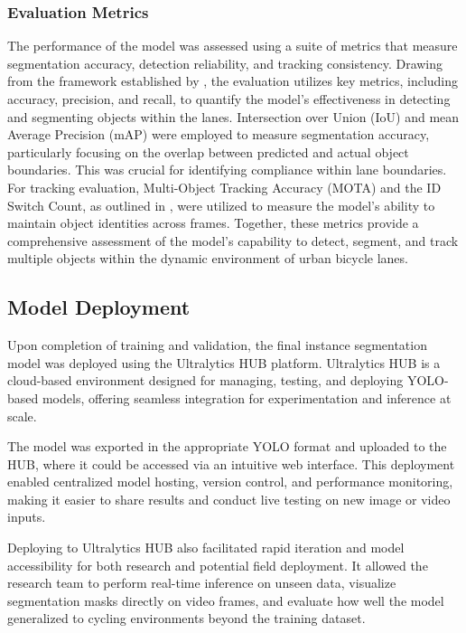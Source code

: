 \subsubsection{Evaluation Metrics}
The performance of the model was assessed using a suite of metrics that measure segmentation accuracy, detection reliability, and tracking consistency. Drawing from the framework established by \citet{GarciaPajuelo2024}, the evaluation utilizes key metrics, including accuracy, precision, and recall, to quantify the model's effectiveness in detecting and segmenting objects within the lanes. Intersection over Union (IoU) and mean Average Precision (mAP) were employed to measure segmentation accuracy, particularly focusing on the overlap between predicted and actual object boundaries. This was crucial for identifying compliance within lane boundaries. For tracking evaluation, Multi-Object Tracking Accuracy (MOTA) and the ID Switch Count, as outlined in \citet{Neven:2018}, were utilized to measure the model's ability to maintain object identities across frames. Together, these metrics provide a comprehensive assessment of the model's capability to detect, segment, and track multiple objects within the dynamic environment of urban bicycle lanes.


\subsection{Model Deployment}

Upon completion of training and validation, the final instance segmentation model was deployed using the Ultralytics HUB platform. Ultralytics HUB is a cloud-based environment designed for managing, testing, and deploying YOLO-based models, offering seamless integration for experimentation and inference at scale.

The model was exported in the appropriate YOLO format and uploaded to the HUB, where it could be accessed via an intuitive web interface. This deployment enabled centralized model hosting, version control, and performance monitoring, making it easier to share results and conduct live testing on new image or video inputs.

Deploying to Ultralytics HUB also facilitated rapid iteration and model accessibility for both research and potential field deployment. It allowed the research team to perform real-time inference on unseen data, visualize segmentation masks directly on video frames, and evaluate how well the model generalized to cycling environments beyond the training dataset.

